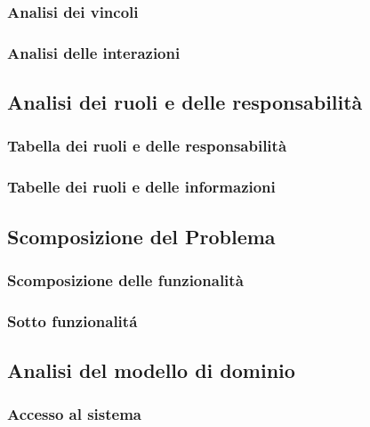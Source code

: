 \documentclass{article}
\begin{document}
\subsubsection{Analisi dei vincoli}

\pagebreak
\subsubsection{Analisi delle interazioni}


\subsection{Analisi dei ruoli e delle responsabilità}
\subsubsection{Tabella dei ruoli e delle responsabilità}

\subsubsection{Tabelle dei ruoli e delle informazioni}

\pagebreak

\subsection{Scomposizione del Problema}
\subsubsection{Scomposizione delle funzionalità}

\subsubsection{Sotto funzionalitá}


\subsection{Analisi del modello di dominio}
\subsubsection{Accesso al sistema}

\end{document}
